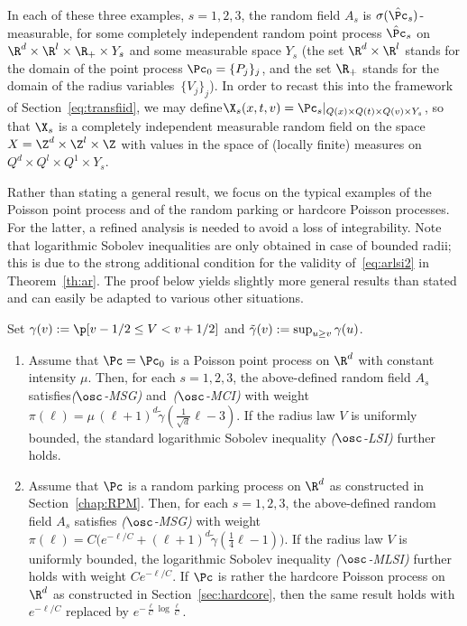 In each of these three examples, $s=1,2,3$, the random field $A_s$ is $\sigma(\hat\Pc_s)$-measurable, for some completely independent random point process $\hat\Pc_s$ on $\R^d\times \R^l\times\R_+\times Y_s$ and some measurable space $Y_s$ (the set $\R^d\times\R^l$ stands for the domain of the point process $\Pc_0=\{P_j\}_j$, and the set $\R_+$ stands for the domain of the radius variables~$\{V_j\}_j$). In order to recast this into the framework of Section~\ref{eq:transfiid}, we may define\linebreak$\X_s(x,t,v)=\Pc_s|_{Q(x)\times Q(t)\times Q(v)\times Y_s}$, so that $\X_s$ is a completely independent measurable random field on the space $X=\Z^d\times \Z^l\times\Z$ with values in the space of (locally finite) measures on $Q^d\times Q^l\times Q^1\times Y_s$.


Rather than stating a general result, we focus on the typical examples of the Poisson point process and of the random parking or hardcore Poisson processes. For the latter, a refined analysis is needed to avoid a loss of integrability. Note that logarithmic Sobolev inequalities are only obtained in case of bounded radii; this is due to the strong additional condition for the validity of~\eqref{eq:arlsi2} in Theorem~\ref{th:ar}. The proof below yields slightly more general results than stated and can easily be adapted to various other situations. 


\begin{prop}\label{prop:genincl-loss}
Set $\gamma(v):=\p[v-1/2\le V< v+1/2]$ and $\tilde\gamma(v)\linebreak:=\sup_{u\ge v}\gamma(u)$.
\begin{enumerate}\romanenumi
\item \label{prop3.6.1}Assume that $\Pc=\Pc_0$ is a Poisson point process on $\R^d$ with constant intensity $\mu$. Then, for each $s=1,2,3$, the above-defined random field $A_s$ satisfies\linebreak\emph{($\osc$-MSG)} and~\emph{($\osc$-MCI)} with weight $\pi(\ell)=\mu\,(\ell+1)^d\tilde\gamma(\frac1{\sqrt d}\ell-3)$. If the radius law $V$ is uniformly bounded, the standard logarithmic Sobolev inequality \emph{($\osc$-LSI)} further holds.%
\item \label{prop3.6.2}Assume that $\Pc$ is a random parking process on $\R^d$ as constructed in Section~\ref{chap:RPM}. Then, for each $s=1,2,3$, the above-defined random field $A_s$ satisfies \emph{($\osc$-MSG)} with weight $\pi(\ell)=C\big(e^{-\ell/C}+(\ell+1)^d\tilde\gamma(\frac14\ell-1)\big)$. If the radius law $V$ is uniformly bounded, the logarithmic Sobolev inequality \emph{($\osc$-MLSI)} further holds with weight $Ce^{-\ell/C}$. If $\Pc$ is rather the hardcore Poisson process on $\R^d$ as constructed in Section~\ref{sec:hardcore}, then the same result holds with $e^{-\ell/C}$ replaced by $e^{-\frac\ell C\log\frac\ell C}$.

\end{enumerate}
\end{prop}




